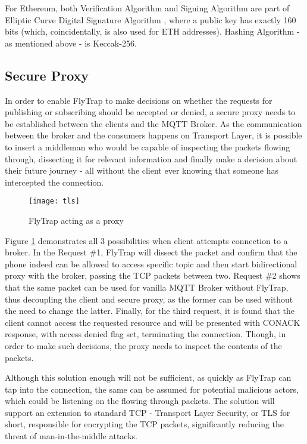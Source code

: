 For Ethereum, both Verification Algorithm and Signing Algorithm are part of Elliptic Curve Digital Signature Algorithm \citep{johnson2001elliptic}, where a public key has exactly 160 bits (which, coincidentally, is also used for ETH addresses). Hashing Algorithm - as mentioned above - is Keccak-256.

\subsection{Secure Proxy}
In order to enable FlyTrap to make decisions on whether the requests for publishing or subscribing should be accepted or denied, a secure proxy needs to be established between the clients and the MQTT Broker. As the communication between the broker and the consumers happens on Transport Layer, it is possible to insert a middleman who would be capable of inspecting the packets flowing through, dissecting it for relevant information and finally make a decision about their future journey - all without the client ever knowing that someone has intercepted the connection. 
\begin{figure}[h]
    \centering
    \texttt{[image: tls]}
    \caption{FlyTrap acting as a proxy}
    \label{fig:tls}
\end{figure}
Figure \ref{fig:tls} demonstrates all 3 possibilities when client attempts connection to a broker. In the Request \#1, FlyTrap will dissect the packet and confirm that the phone indeed can be allowed to access specific topic and then start bidirectional proxy with the broker, passing the TCP packets between two. Request \#2 shows that the same packet can be used for vanilla MQTT Broker without FlyTrap, thus decoupling the client and secure proxy, as the former can be used without the need to change the latter. Finally, for the third request, it is found that the client cannot access the requested resource and will be presented with CONACK response, with access denied flag set, terminating the connection. Though, in order to make such decisions, the proxy needs to inspect the contents of the packets.

Although this solution enough will not be sufficient, as quickly as FlyTrap can tap into the connection, the same can be assumed for potential malicious actors, which could be listening on the flowing through packets. The solution will support an extension to standard TCP - Transport Layer Security, or TLS for short, responsible for encrypting the TCP packets, significantly reducing the threat of man-in-the-middle attacks.

